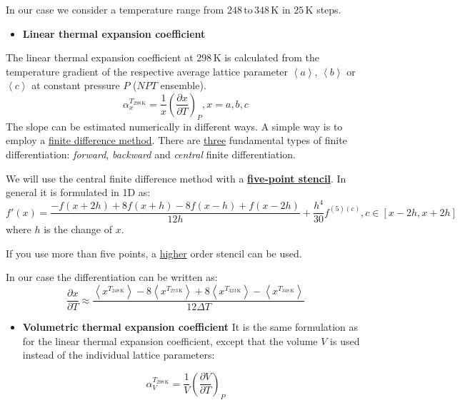 \documentclass[
  letterpaper,
]{article}
\providecommand{\tightlist}{%
  \setlength{\itemsep}{0pt}\setlength{\parskip}{0pt}}\usepackage{longtable,booktabs,array}
\begin{document}
In our case we consider a temperature range from
\(248\,\text{to}\,348\,\mathrm{K}\) in \(25\,\mathrm{K}\) steps.

\begin{itemize}
\tightlist
\item
  \textbf{Linear thermal expansion coefficient}
\end{itemize}

The linear thermal expansion coefficient at \(\mathrm{298}\,\mathrm{K}\)
is calculated from the temperature gradient of the respective average
lattice parameter \(\left < a \right >\), \(\left < b \right >\) or
\(\left < c\right >\) at constant pressure \(P\) (\(NPT\) ensemble). \[
\alpha _{x}^{T_{\mathrm{298\,K}}} = \frac{1}{x} \left ( \frac{\partial x}{\partial T} \right ) _{P}, x={a,b,c}
\] The slope can be estimated numerically in different ways. A simple
way is to employ a
\href{https://en.wikipedia.org/wiki/Finite_difference_method}{finite
difference method}. There are
\href{https://en.wikipedia.org/wiki/Finite_difference}{three}
fundamental types of finite differentiation: \emph{forward},
\emph{backward} and \emph{central} finite differentiation.

We will use the central finite difference method with a
\textbf{\href{https://en.wikipedia.org/wiki/Five-point_stencil}{five-point
stencil}}. In general it is formulated in 1D as: \[
f'(x) = \frac{-f(x+2h)+8f(x+h)-8f(x-h)+f(x-2h)}{12 h} + \frac{h^4}{30}f^{(5)(c)}, c \in [x-2h,x+2h]
\] where \(h\) is the change of \(x\).

If you use more than five points, a
\href{https://en.wikipedia.org/wiki/Finite_difference_coefficient}{higher}
order stencil can be used.

In our case the differentiation can be written as: \[
\frac{\partial x}{\partial T} \approx \frac{ \left < x^{T_{\mathrm{248\,K}}}\right >-8 \left < x^{T_{\mathrm{273\,K}}}\right > + 8 \left < x^{T_{\mathrm{323\,K}}}\right > - \left < x^{T_{\mathrm{348\,K}}} \right > }{12\Delta T}
\]

\begin{itemize}
\tightlist
\item
  \textbf{Volumetric thermal expansion coefficient} It is the same
  formulation as for the linear thermal expansion coefficient, except
  that the volume \(V\) is used instead of the individual lattice
  parameters:
\end{itemize}

\[
\alpha _{V}^{T_{\mathrm{298\,K}}} = \frac{1}{V} \left ( \frac{\partial V}{\partial T} \right ) _{P}
\]
\end{document}
